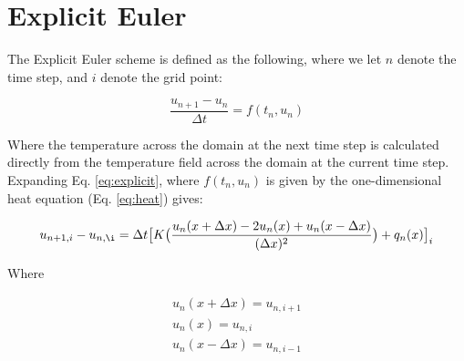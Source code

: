 \documentclass[10pt, letter, showtrims]{extarticle}
\begin{document}
		\noindent
		\section{Explicit Euler}

		\noindent
		The Explicit Euler scheme is defined as the following, where we let $n$ denote the time step, and $i$ denote the grid point:
		
		\begin{equation}
		\label{eq:explicit}
			\frac{u_{n+1} - u_{n}}{\Delta t} = f(t_{n}, u_{n})
		\end{equation}
		
		\noindent
		Where the temperature across the domain at the next time step is calculated directly from the temperature field across the domain at the current time step. \\
		
		\noindent
		Expanding Eq. \ref{eq:explicit}, where $f(t_{n}, u_{n})$ is given by the one-dimensional heat equation (Eq. \ref{eq:heat}) gives:
		
		
		\begin{equation}
			u_{n+1,i} - u_{n,\i} = \Delta t \big[ K \big(\frac{u_{n}(x + \Delta x) - 2 u_{n}(x) + u_{n}(x - \Delta x)}{(\Delta x)^{2}}\big) + q_{n}(x) \big]_{i}
		\end{equation}
		
		\noindent
		Where
		
		\begin{equation}
		\label{eq:delta}
			\begin{split}
				u_{n}(x + \Delta x) = u_{n,i+1} \\
				u_{n}(x)            = u_{n,i} \\
				u_{n}(x - \Delta x) = u_{n,i-1}
			\end{split}
		\end{equation}
		
%		
		
\end{document}

